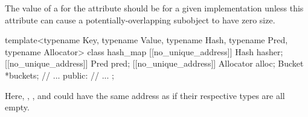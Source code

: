 \recommended
The value of a 
for the  attribute
should be  for a given implementation
unless this attribute can cause a potentially-overlapping subobject
to have zero size.

\begin{example}
\begin{codeblock}
template<typename Key, typename Value,
         typename Hash, typename Pred, typename Allocator>
class hash_map {
  [[no_unique_address]] Hash hasher;
  [[no_unique_address]] Pred pred;
  [[no_unique_address]] Allocator alloc;
  Bucket *buckets;
  // ...
public:
  // ...
};
\end{codeblock}
Here, , , and 
could have the same address as 
if their respective types are all empty.
\end{example}
